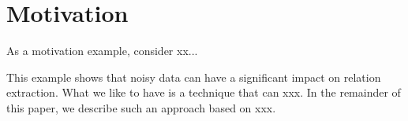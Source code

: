 \section{Motivation}
As a motivation example, consider xx...

This example shows that noisy data can have a significant impact on relation extraction. What we like to have is a technique that can xxx.
In the remainder of this paper, we describe such an approach based on xxx. 